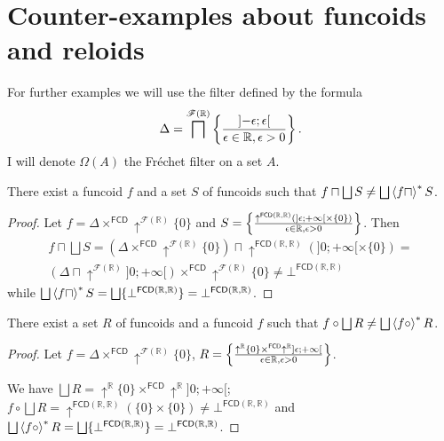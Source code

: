 
\chapter{Counter-examples about funcoids and reloids}

For further examples we will use the filter defined by the formula
\[
\Delta=\bigsqcap^{\mathscr{F}(\mathbb{R})}\left\{ \frac{\mathopen]-\epsilon;\epsilon\mathclose[}{\epsilon\in\mathbb{R},\epsilon>0}\right\}.
\]
I will denote $\Omega(A)$ the Fr\'echet filter on a set $A$.
\begin{example}\label{fcd-not-infdist}
There exist a funcoid $f$ and a set $S$ of funcoids such that $f\sqcap\bigsqcup S\neq\bigsqcup\rsupfun{f\sqcap}S$.\end{example}
\begin{proof}
Let $f=\Delta\times^{\mathsf{FCD}}\uparrow^{\mathscr{F}(\mathbb{R})}\{0\}$
and $S=\left\{ \frac{\uparrow^{\mathsf{FCD}(\mathbb{R},\mathbb{R})}(]\epsilon;+\infty[\times\{0\})}{\epsilon\in\mathbb{R},\epsilon>0}\right\}$.
Then
\begin{multline*}
f\sqcap\bigsqcup S=(\Delta\times^{\mathsf{FCD}}\uparrow^{\mathscr{F}(\mathbb{R})}\{0\})\sqcap\uparrow^{\mathsf{FCD}(\mathbb{R},\mathbb{R})}(]0;+\infty[\times\{0\})=\\
(\Delta\sqcap\uparrow^{\mathscr{F}(\mathbb{R})}]0;+\infty[)\times^{\mathsf{FCD}}\uparrow^{\mathscr{F}(\mathbb{R})}\{0\}\ne\bot^{\mathsf{FCD}(\mathbb{R},\mathbb{R})}
\end{multline*}
while $\bigsqcup\rsupfun{f\sqcap}S=\bigsqcup\{\bot^{\mathsf{FCD}(\mathbb{R},\mathbb{R})}\}=\bot^{\mathsf{FCD}(\mathbb{R},\mathbb{R})}$.\end{proof}
\begin{example}
There exist a set $R$ of funcoids and a funcoid $f$ such that $f\circ\bigsqcup R\neq\bigsqcup\rsupfun{f\circ}R$.\end{example}
\begin{proof}
Let $f=\Delta\times^{\mathsf{FCD}}\uparrow^{\mathscr{F}(\mathbb{R})}\{0\}$,
$R=\left\{ \frac{\uparrow^{\mathbb{R}}\{0\}\times^{\mathsf{FCD}}\uparrow^{\mathbb{R}}]\epsilon;+\infty[}{\epsilon\in\mathbb{R},\epsilon>0}\right\}$.

We have $\bigsqcup R=\uparrow^{\mathbb{R}}\{0\}\times^{\mathsf{FCD}}\uparrow^{\mathbb{R}}]0;+\infty[$;
$f\circ\bigsqcup R=\uparrow^{\mathsf{FCD}(\mathbb{R},\mathbb{R})}(\{0\}\times\{0\})\ne\bot^{\mathsf{FCD}(\mathbb{R},\mathbb{R})}$
and $\bigsqcup\rsupfun{f\circ}R=\bigsqcup\{\bot^{\mathsf{FCD}(\mathbb{R},\mathbb{R})}\}=\bot^{\mathsf{FCD}(\mathbb{R},\mathbb{R})}$.\end{proof}
